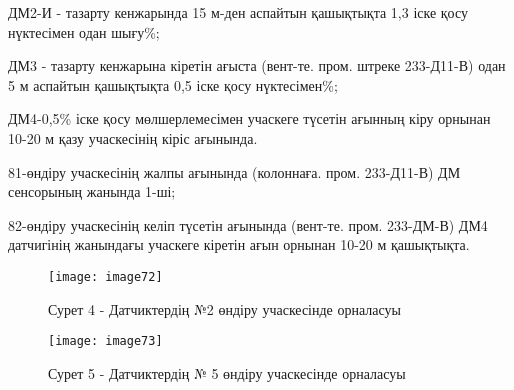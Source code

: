 \begin{multicols}{2}
ДМ2-И - тазарту кенжарында 15 м-ден аспайтын қашықтықта 1,3 іске қосу
нүктесімен одан шығу\%;

ДМ3 - тазарту кенжарына кіретін ағыста (вент-те. пром. штреке 233-Д11-В)
одан 5 м аспайтын қашықтықта 0,5 іске қосу нүктесімен\%;

ДМ4-0,5\% іске қосу мөлшерлемесімен учаскеге түсетін ағынның кіру
орнынан 10-20 м қазу учаскесінің кіріс ағынында.

81-өндіру учаскесінің жалпы ағынында (колоннаға. пром. 233-Д11-В) ДМ
сенсорының жанында 1-ші;

82-өндіру учаскесінің келіп түсетін ағынында (вент-те. пром. 233-ДМ-В)
ДМ4 датчигінің жанындағы учаскеге кіретін ағын орнынан 10-20 м
қашықтықта.
\end{multicols}

\begin{figure}[H]
    \centering
    \texttt{[image: image72]}
    \caption*{Сурет 4 - Датчиктердің №2 өндіру учаскесінде орналасуы}
\end{figure}
\begin{figure}[H]
    \centering
    \texttt{[image: image73]}
    \caption*{Сурет 5 - Датчиктердің № 5 өндіру учаскесінде орналасуы}
\end{figure}

